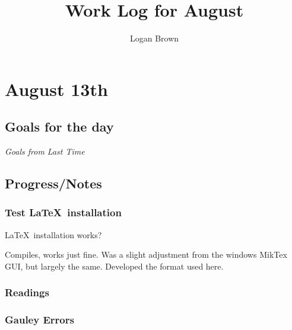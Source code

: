 \documentclass[11pt]{article} %
\title{Work Log for August}
\author{Logan Brown}
\newcommand\NoIndent[1]{%
  \par\vbox{\parbox[t]{\linewidth}{#1}}%
}
\begin{document}


\setcounter{section}{12}
\setcounter{subsection}{-1}
\setcounter{subsubsection}{0}

\section{August 13th}
\subsection{Goals for the day}

\textit{Goals from Last Time}

\subsection{Progress/Notes}
\subsubsection{Test \LaTeX~installation}
\LaTeX~installation works?

Compiles, works just fine. Was a slight adjustment from the windows MikTex GUI, but largely the same.
Developed the format used here.

\subsubsection{Readings}

\subsubsection{Gauley Errors}
\end{document}
